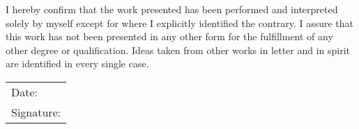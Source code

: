 \documentclass[12pt, a4paper, bibtotoc]{scrartcl}
\theoremstyle{break}
\begin{document}
\clearpage  %
\newpage
\thispagestyle{empty}  %
\null\vfill            %
\begin{center}
I hereby confirm that the work presented has been performed and interpreted solely by
myself except for where I explicitly identified the contrary. I assure that this work has
not been presented in any other form for the fulfillment of any other degree or
qualification. Ideas taken from other works in letter and in spirit are identified
in every single case.
\end{center}

\vspace{2cm} %

\begin{flushright}
\begin{tabular}{p{8cm}}
Date: \underline{\hspace{3cm}} \\ [1.0ex]
Signature: \underline{\hspace{3cm}}
\end{tabular}
\end{flushright}

\vfill\null
\newpage
\end{document}
